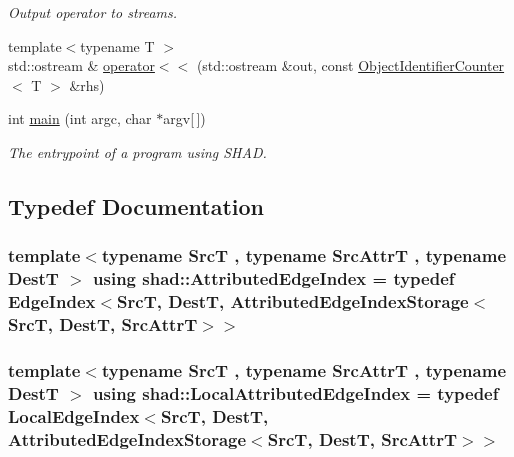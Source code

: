 \begin{DoxyCompactItemize}
\begin{DoxyCompactList}\small\item\em Output operator to streams. \end{DoxyCompactList}\item 
{\footnotesize template$<$typename T $>$ }\\std\-::ostream \& \hyperlink{namespaceshad_aa50b0a9ddf671edce6ba55be6975896a}{operator$<$$<$} (std\-::ostream \&out, const \hyperlink{classshad_1_1ObjectIdentifierCounter}{Object\-Identifier\-Counter}$<$ T $>$ \&rhs)
\item 
int \hyperlink{namespaceshad_a9f30a41da5e389095d44fe5b1c9e6f5e}{main} (int argc, char $\ast$argv\mbox{[}$\,$\mbox{]})
\begin{DoxyCompactList}\small\item\em The entrypoint of a program using S\-H\-A\-D. \end{DoxyCompactList}\end{DoxyCompactItemize}


\subsection{Typedef Documentation}
\hypertarget{namespaceshad_a4fcdd0f79705e26acfcc087f7299e70e}{
\subsubsection[{Attributed\-Edge\-Index}]{\setlength{\rightskip}{0pt plus 5cm}template$<$typename Src\-T , typename Src\-Attr\-T , typename Dest\-T $>$ using {\bf shad\-::\-Attributed\-Edge\-Index} = typedef {\bf Edge\-Index}$<$Src\-T, Dest\-T, {\bf Attributed\-Edge\-Index\-Storage}$<$Src\-T, Dest\-T, Src\-Attr\-T$>$$>$}}\label{namespaceshad_a4fcdd0f79705e26acfcc087f7299e70e}
\hypertarget{namespaceshad_a1c829d1964a31a103acef7260a679a67}{
\subsubsection[{Local\-Attributed\-Edge\-Index}]{\setlength{\rightskip}{0pt plus 5cm}template$<$typename Src\-T , typename Src\-Attr\-T , typename Dest\-T $>$ using {\bf shad\-::\-Local\-Attributed\-Edge\-Index} = typedef {\bf Local\-Edge\-Index}$<$Src\-T, Dest\-T, {\bf Attributed\-Edge\-Index\-Storage}$<$Src\-T, Dest\-T, Src\-Attr\-T$>$$>$}}\label{namespaceshad_a1c829d1964a31a103acef7260a679a67}


